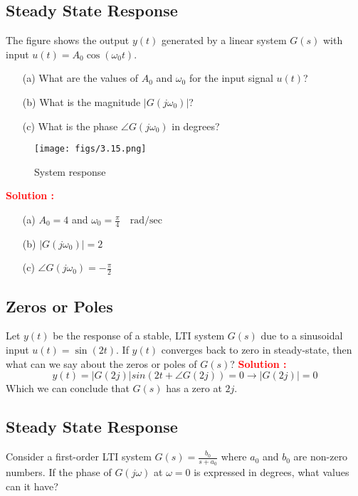 \documentclass[12pt]{article}
\begin{document}
\clearpage
\subsection{Steady State Response}

The figure shows the output \(y(t)\) generated by a linear system \(G(s)\) with input \(u(t) = A_0 \cos(\omega_0 t)\).
\begin{itemize}
    \item[(a)] What are the values of \(A_0\) and \(\omega_0\) for the input signal \(u(t)\)?
    \item[(b)] What is the magnitude \(|G(j\omega_0)|\)?
    \item[(c)] What is the phase \(\angle G(j\omega_0)\) in degrees?
\end{itemize}
\begin{figure}[h]
\centering
\texttt{[image: figs/3.15.png]}
\caption{System response}
\end{figure}
\textbf{\textcolor{red}{Solution :}}
\begin{itemize}
    \item[(a)] \(A_0 = 4\) and \(\omega_0 = \frac{\pi}{4} \quad \text{rad/sec}\)
    \item[(b)] \(|G(j\omega_0)| = 2\) 
    \item[(c)] \(\angle G(j\omega_0) = -\frac{\pi}{2}\)
\end{itemize}

\clearpage
\subsection{Zeros or Poles}

Let \(y(t)\) be the response of a stable, LTI system \(G(s)\) due to a sinusoidal input \(u(t) = \sin(2t)\). If \(y(t)\) converges back to zero in steady-state, then what can we say about the zeros or poles of \(G(s)\)?
\textbf{\textcolor{red}{Solution :}}
\[y(t) = |G(2j)|sin(2t+\angle G(2j)) = 0 \rightarrow |G(2j)| = 0\]
Which we can conclude that \(G(s)\) has a zero at \(2j\).

\clearpage
\subsection{Steady State Response}

Consider a first-order LTI system \(G(s) = \frac{b_0}{s+a_0} \) where \(a_0\) and \(b_0\) are non-zero numbers. If the phase of \(G(j\omega)\) at \(\omega = 0\) is expressed in degrees, what values can it have?
\end{document}
